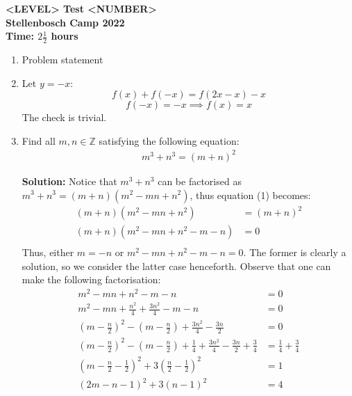 \documentclass{article}
\begin{document}
\thispagestyle{empty}

\begin{center}
  \textbf{\Large <LEVEL> Test <NUMBER>}
  \\ \vspace{1em}
  \textbf{\large Stellenbosch Camp 2022}
  \\ \vspace{1em}
  \textbf{\large Time: $2\frac{1}{2}$ hours}
\end{center}

\bigskip

\begin{enumerate}[itemsep=\fill]

\item %
Problem statement


\item %
Let $y = -x$:
\[f(x) + f(-x) = f(2x-x) - x\]
\[f(-x) = -x\implies f(x) = x\]
The check is trivial.

\item %
Find all $m,n\in \mathbb{Z}$ satisfying the following equation:
\begin{align}
m^3 + n^3 = (m+n)^2 
\end{align}

\textbf{Solution:} Notice that $m^3 + n^3$ can be factorised as $m^3 + n^3=(m+n)(m^{2} -mn + n^{2})$, thus equation (1) becomes:
\begin{align*}
    (m+n)(m^{2} -mn + n^{2}) & = (m+n)^2\\
    (m+n)(m^{2} -mn + n^{2} -m -n) & = 0 \\
\end{align*}
Thus, either $m = -n$ or $m^{2} -mn + n^{2} -m -n = 0$. The former is clearly a solution, so we consider the latter case henceforth. Observe that one can make the following factorisation:
\begin{align}
    m^{2} -mn + n^{2} -m -n & = 0 \nonumber\\ 
    m^{2} - mn + \frac{n^{2}}{4} + \frac{3n^{2}}{4} - m -n & = 0 \nonumber\\
    \left(m - \frac{n}{2}\right)^{2} - \left(m - \frac{n}{2}\right) + \frac{3n^{2}}{4} - \frac{3n}{2} & = 0 \nonumber\\
    \left(m - \frac{n}{2}\right)^{2} - \left(m - \frac{n}{2}\right) + \frac{1}{4} + \frac{3n^{2}}{4} - \frac{3n}{2} + \frac{3}{4} & = \frac{1}{4} +\frac{3}{4} \nonumber\\
    \left(m - \frac{n}{2} - \frac{1}{2}\right)^{2} +3\left(\frac{n}{2} - \frac{1}{2}\right)^{2} & = 1 \nonumber\\
    (2m - n - 1)^{2} + 3(n-1)^{2} & = 4 
\end{align}


\end{enumerate}
\end{document}
